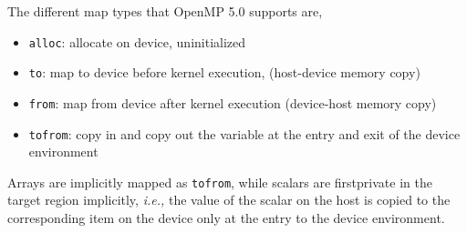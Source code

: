 The different map types that OpenMP 5.0 supports are, 
\begin{itemize}
\vspace{-5pt}
 \item \texttt{alloc}: allocate on device, uninitialized
 \item \texttt{to}: map to device before kernel execution, (host-device memory copy)
 \item \texttt{from}:  map from device after kernel execution (device-host memory copy)
 \item \texttt{tofrom}: copy in and copy out the variable at the entry and exit of the device environment  
\end{itemize}
\vspace{-9pt}
Arrays are implicitly mapped as \texttt{tofrom}, while scalars are firstprivate 
 in the target region implicitly, {\em i.e.,} the value of the scalar on the host
is copied to the corresponding item on the device only at the entry to the device
environment.
